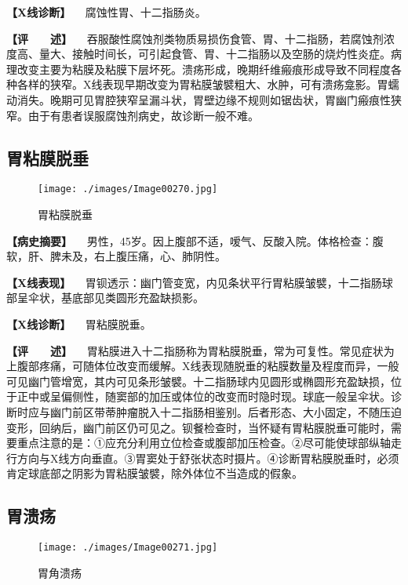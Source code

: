 \textbf{【X线诊断】} 　腐蚀性胃、十二指肠炎。

\textbf{【评　　述】}
　吞服酸性腐蚀剂类物质易损伤食管、胃、十二指肠，若腐蚀剂浓度高、量大、接触时间长，可引起食管、胃、十二指肠以及空肠的烧灼性炎症。病理改变主要为粘膜及粘膜下层坏死。溃疡形成，晚期纤维瘢痕形成导致不同程度各种各样的狭窄。X线表现早期改变为胃粘膜皱襞粗大、水肿，可有溃疡龛影。胃蠕动消失。晚期可见胃腔狭窄呈漏斗状，胃壁边缘不规则如锯齿状，胃幽门瘢痕性狭窄。由于有患者误服腐蚀剂病史，故诊断一般不难。

\subsection{胃粘膜脱垂}

\begin{figure}[!htbp]
 \centering
 \texttt{[image: ./images/Image00270.jpg]}
 \captionsetup{justification=centering}
 \caption{胃粘膜脱垂}
 \label{fig5-3-9}
  \end{figure} 

\textbf{【病史摘要】}
　男性，45岁。因上腹部不适，嗳气、反酸入院。体格检查：腹软，肝、脾未及，右上腹压痛，心、肺阴性。

\textbf{【X线表现】}
　胃钡透示：幽门管变宽，内见条状平行胃粘膜皱襞，十二指肠球部呈伞状，基底部见类圆形充盈缺损影。

\textbf{【X线诊断】} 　胃粘膜脱垂。

\textbf{【评　　述】}
　胃粘膜进入十二指肠称为胃粘膜脱垂，常为可复性。常见症状为上腹部疼痛，可随体位改变而缓解。X线表现随脱垂的粘膜数量及程度而异，一般可见幽门管增宽，其内可见条形皱襞。十二指肠球内见圆形或椭圆形充盈缺损，位于正中或呈偏侧性，随窦部的加压或体位的改变而时隐时现。球底一般呈伞状。诊断时应与幽门前区带蒂肿瘤脱入十二指肠相鉴别。后者形态、大小固定，不随压迫变形，回纳后，幽门前区仍可见之。钡餐检查时，当怀疑有胃粘膜脱垂可能时，需要重点注意的是：①应充分利用立位检查或腹部加压检查。②尽可能使球部纵轴走行方向与X线方向垂直。③胃窦处于舒张状态时摄片。④诊断胃粘膜脱垂时，必须肯定球底部之阴影为胃粘膜皱襞，除外体位不当造成的假象。

\subsection{胃溃疡}

\begin{figure}[!htbp]
 \centering
 \texttt{[image: ./images/Image00271.jpg]}
 \captionsetup{justification=centering}
 \caption{胃角溃疡}
 \label{fig5-3-10}
  \end{figure} 


